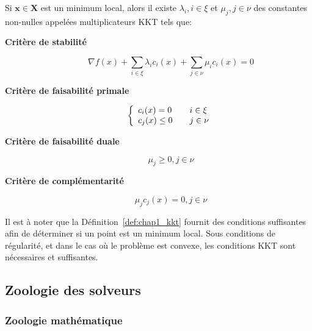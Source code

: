 \begin{mydef}\label{def:chap1_kkt}
Si $\mathbf{x} \in \mathbf{X}$ est un minimum local, alors il existe
$\lambda_i, i \in \xi$ et $\mu_j, j \in \nu$ des constantes non-nulles
appelées multiplicateurs KKT tels que:
%
\begin{description}
\item[\textbf{Critère de stabilité}] \begin{equation}
  \nabla f(x) + \sum_{i \in \xi} \lambda_i c_i(x) + \sum_{j \in \nu} \mu_i c_i(x) = 0
\end{equation}
\item[\textbf{Critère de faisabilité primale}] \begin{equation}
\left\{
\begin{array}{l l}
  c_i (x) = 0    & \quad i \in \xi \\
  c_j (x) \leq 0 & \quad j \in \nu \\
\end{array} \right.
\end{equation}
\item[\textbf{Critère de faisabilité duale}] \begin{equation}
\mu_j \geq 0, j \in \nu
\end{equation}
\item[\textbf{Critère de complémentarité}] \begin{equation}
\mu_j c_j(x) = 0, j \in \nu
\end{equation}
\end{description}
\end{mydef}

Il est à noter que la Définition~\ref{def:chap1_kkt} fournit des
conditions suffisantes afin de déterminer si un point est un minimum
local. Sous conditions de régularité, et dans le cas où le problème
est convexe, les conditions KKT sont nécessaires et suffisantes.


\subsection{Zoologie des solveurs}

\subsubsection{Zoologie mathématique}


